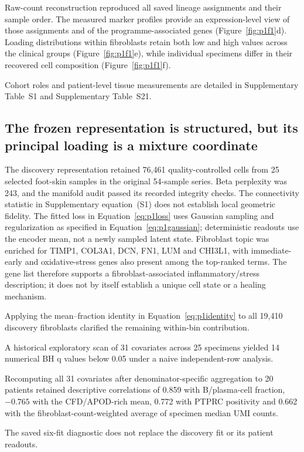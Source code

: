 \documentclass[10pt,a4paper]{article}
\begin{document}
Raw-count reconstruction reproduced all saved lineage assignments and their sample order. The measured marker profiles provide an expression-level view of those assignments and of the programme-associated genes (Figure~\ref{fig:p1f1}d). Loading distributions within fibroblasts retain both low and high values across the clinical groups (Figure~\ref{fig:p1f1}e), while individual specimens differ in their recovered cell composition (Figure~\ref{fig:p1f1}f).

Cohort roles and patient-level tissue measurements are detailed in Supplementary Table~S1 and Supplementary Table~S21.

\subsection{The frozen representation is structured, but its principal loading is a mixture coordinate}
The discovery representation retained 76,461 quality-controlled cells from 25 selected foot-skin samples in the original 54-sample series. Beta perplexity was 243, and the manifold audit passed its recorded integrity checks. The connectivity statistic in Supplementary equation~(S1) does not establish local geometric fidelity. The fitted loss in Equation~\eqref{eq:p1loss} uses Gaussian sampling and regularization as specified in Equation~\eqref{eq:p1gaussian}; deterministic readouts use the encoder mean, not a newly sampled latent state. Fibroblast topic was enriched for TIMP1, COL3A1, DCN, FN1, LUM and CHI3L1, with immediate-early and oxidative-stress genes also present among the top-ranked terms. The gene list therefore supports a fibroblast-associated inflammatory/stress description; it does not by itself establish a unique cell state or a healing mechanism.

Applying the mean--fraction identity in Equation~\eqref{eq:p1identity} to all 19,410 discovery fibroblasts clarified the remaining within-bin contribution.

A historical exploratory scan of 31 covariates across 25 specimens yielded 14 numerical BH q values below 0.05 under a naive independent-row analysis.

Recomputing all 31 covariates after denominator-specific aggregation to 20 patients retained descriptive correlations of 0.859 with B/plasma-cell fraction, $-0.765$ with the CFD/APOD-rich mean, 0.772 with PTPRC positivity and 0.662 with the fibroblast-count-weighted average of specimen median UMI counts.

The saved six-fit diagnostic does not replace the discovery fit or its patient readouts.
\end{document}
